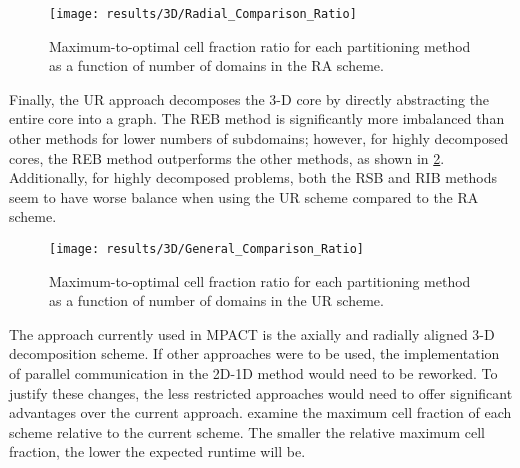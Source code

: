 {{{      \begin{figure}
        \centering
        \texttt{[image: results/3D/Radial\_Comparison\_Ratio]}
        \caption{Maximum-to-optimal cell fraction ratio for each partitioning method as a function of number of domains in the \acf{RA} scheme. \label{fig:Spatial Decomposition:3D R Max. to Optimal Cell Ratio}}
      \end{figure}

      Finally, the \ac{UR} approach decomposes the 3-D core by directly abstracting the entire core into a graph.
      The \ac{REB} method is significantly more imbalanced than other methods for lower numbers of subdomains; however, for highly decomposed cores, the \ac{REB} method outperforms the other methods, as shown in \cref{fig:Spatial Decomposition:3D U Max. to Optimal Cell Ratio}.
      Additionally, for highly decomposed problems, both the \ac{RSB} and \ac{RIB} methods seem to have worse balance when using the \ac{UR} scheme compared to the \ac{RA} scheme.

      \begin{figure}
        \centering
        \texttt{[image: results/3D/General\_Comparison\_Ratio]}
        \caption{Maximum-to-optimal cell fraction ratio for each partitioning method as a function of number of domains in the \acf{UR} scheme. \label{fig:Spatial Decomposition:3D U Max. to Optimal Cell Ratio}}
      \end{figure}

      The approach currently used in MPACT is the axially and radially aligned 3-D decomposition scheme.
      If other approaches were to be used, the implementation of parallel communication in the 2D-1D method would need to be reworked.
      To justify these changes, the less restricted approaches would need to offer significant advantages over the current approach.
       examine the maximum cell fraction of each scheme relative to the current scheme.
      The smaller the relative maximum cell fraction, the lower the expected runtime will be.

}}}

